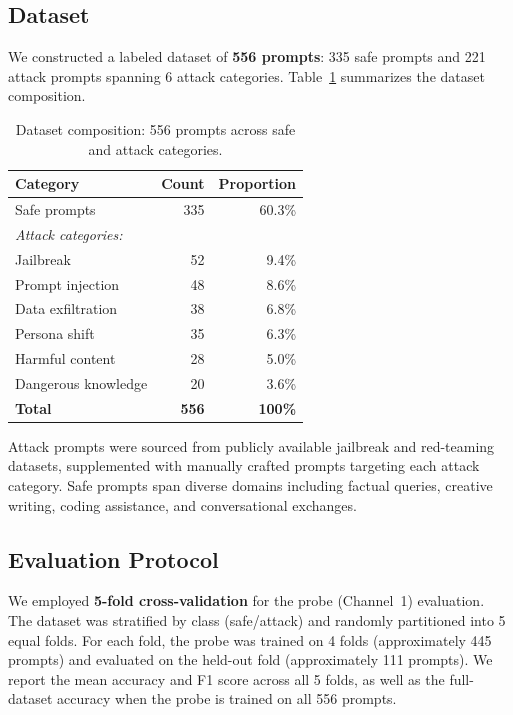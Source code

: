 \documentclass[11pt]{article}
\begin{document}
\subsection{Dataset}

We constructed a labeled dataset of \textbf{556 prompts}: 335 safe prompts and 221 attack prompts spanning 6 attack categories. Table~\ref{tab:dataset} summarizes the dataset composition.

\begin{table}[H]
\centering
\caption{Dataset composition: 556 prompts across safe and attack categories.}
\label{tab:dataset}
\begin{tabular}{lrr}
\toprule
\textbf{Category} & \textbf{Count} & \textbf{Proportion} \\
\midrule
Safe prompts & 335 & 60.3\% \\
\midrule
\multicolumn{3}{l}{\textit{Attack categories:}} \\
\quad Jailbreak          & 52  & 9.4\% \\
\quad Prompt injection   & 48  & 8.6\% \\
\quad Data exfiltration  & 38  & 6.8\% \\
\quad Persona shift      & 35  & 6.3\% \\
\quad Harmful content    & 28  & 5.0\% \\
\quad Dangerous knowledge & 20  & 3.6\% \\
\midrule
\textbf{Total} & \textbf{556} & \textbf{100\%} \\
\bottomrule
\end{tabular}
\end{table}

Attack prompts were sourced from publicly available jailbreak and red-teaming datasets, supplemented with manually crafted prompts targeting each attack category. Safe prompts span diverse domains including factual queries, creative writing, coding assistance, and conversational exchanges.

\subsection{Evaluation Protocol}

We employed \textbf{5-fold cross-validation} for the probe (Channel~1) evaluation. The dataset was stratified by class (safe/attack) and randomly partitioned into 5 equal folds. For each fold, the probe was trained on 4 folds (approximately 445 prompts) and evaluated on the held-out fold (approximately 111 prompts). We report the mean accuracy and F1 score across all 5 folds, as well as the full-dataset accuracy when the probe is trained on all 556 prompts.
\end{document}
